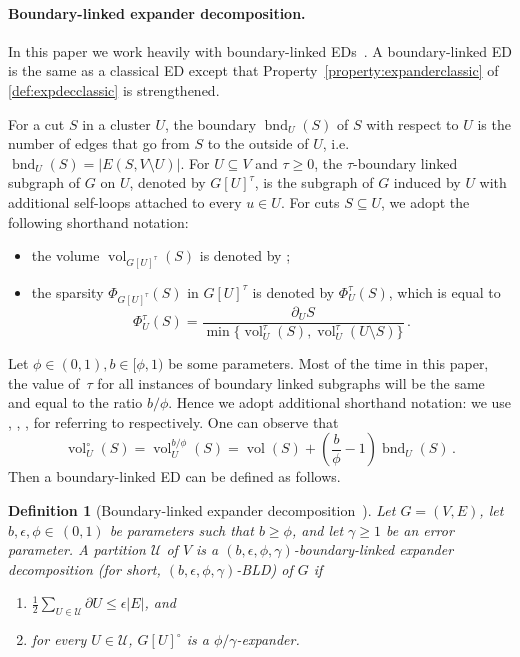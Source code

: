 \documentclass[epsfig,letter,11pt]{article}
\numberwithin{equation}{section}
\DeclareMathOperator{\vol}{vol}
\newcommand{\unbor}[2]{\operatorname{bnd}_{#2} (#1)}
\newcommand{\uncut}[2]{{\partial}_{#2} #1}
\newcommand{\uncutg}[1]{{\partial} #1}
\newtheorem{definition}[theorem]{Definition}
\begin{document}
\paragraph{Boundary-linked expander decomposition.}
In this paper we work heavily with boundary-linked EDs~\cite{boundlink}. A boundary-linked ED is the same as a classical ED except that Property~\eqref{property:expanderclassic} of \cref{def:expdecclassic} is strengthened. 

For a cut $S$ in a cluster $U$, the boundary $\unbor{S}{U}$ of $S$ with respect to $U$ is the number of edges that go from $S$ to the outside of $U$, i.e. $\unbor{S}{U}=|E(S,V \setminus U)|$. For $U \subseteq V$ and $\tau \geq 0$, the $\tau$-boundary linked subgraph of $G$ on $U$, denoted by $G[U]^{\tau}$, is the subgraph of $G$ induced by $U$ with additional \smash{$\tau \cdot \unbor{\{u\}}{U}$} self-loops attached to every $u \in U$.
	For cuts $S \subseteq U$, we adopt the following shorthand notation:
	\begin{itemize}
		\item the volume $\vol_{G[U]^{\tau}}(S)$ is denoted by \smash{$\vol_U^{\tau}(S)$};
		\item the sparsity $\Phi_{G[U]^{\tau}}(S)$ in $G[U]^{\tau}$ is denoted by $\Phi_U^{\tau}(S)$, which is equal to
		\begin{equation*}
			\Phi_U^{\tau}(S) = \frac{\uncut{S}{U}}{\min\{\vol_U^{\tau}(S), \vol_U^{\tau}(U \setminus S)\}} \, .
		\end{equation*}
	\end{itemize}
Let $\phi \in (0,1), b \in [\phi, 1)$ be some parameters. Most of the time in this paper, the value of~$\tau$ for all instances of boundary linked subgraphs will be the same and equal to the ratio $b/\phi$. Hence we adopt additional shorthand notation: we use , \smash{$\vol_U^\circ(S)$}, ,  for referring to \smash{$G[U]^{{b/\phi}}$, $\vol_U^{b/\phi}(S)$, $\Phi_U^{b/\phi}(S)$, $\Phi_U^{b/\phi}$} respectively.
One can observe that
\begin{equation*}
	\vol_U^\circ(S) = \vol_U^{b/\phi}(S) = \vol(S)+\left(\frac{b}{\phi}-1\right)\unbor{S}{U} \, .
\end{equation*}
\noindent
Then a boundary-linked ED can be defined as follows.

\begin{definition}[Boundary-linked expander decomposition~\cite{boundlink}]
	\label{def:expdec}
	Let $G=(V,E)$, let $b, \epsilon, \phi \in \, (0,1)$ be parameters such that $b \ge \phi$, and let $\gamma \ge 1$ be an error parameter. A partition $\mathcal{U}$ of $V$ is a $(b, \epsilon, \phi, \gamma)$-boundary-linked expander decomposition (for short, $(b, \epsilon, \phi, \gamma)$-BLD) of $G$ if
	\begin{enumerate}
		\item \label{property:crossing} $\frac{1}{2}\sum_{U \in \mathcal{U}} \uncutg{U} \le \epsilon |E|$, and
		\item \label{property:expander} for every $U \in \mathcal{U}$, $G[U]^{\circ}$ is a $ \phi/\gamma$-expander.
	\end{enumerate}
\end{definition}
\end{document}
